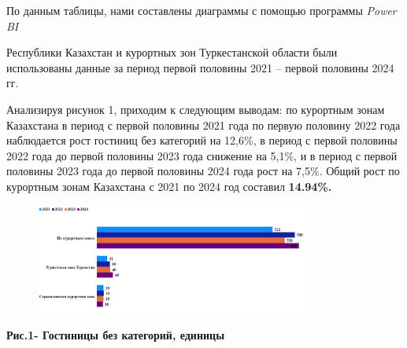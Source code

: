 
По данным таблицы, нами составлены диаграммы с помощью программы
\emph{Power BI}

Республики Казахстан и курортных зон Туркестанской области были
использованы данные за период первой половины 2021 -- первой половины
2024 гг.

Анализируя рисунок 1, приходим к следующим выводам: по курортным зонам
Казахстана в период с первой половины 2021 года по первую половину 2022
года наблюдается рост гостиниц без категорий на 12,6\%, в период с
первой половины 2022 года до первой половины 2023 года снижение на
5,1\%, и в период с первой половины 2023 года до первой половины 2024
года рост на 7,5\%. Общий рост по курортным зонам Казахстана с 2021 по
2024 год составил {\bfseries 14.94\%.}


\begin{figure}[H]
	\centering
	\includegraphics[width=0.8\textwidth]{media/ekon/image3}
	\caption*{}
\end{figure}


{\bfseries Рис.1- Гостиницы без категорий, единицы}

